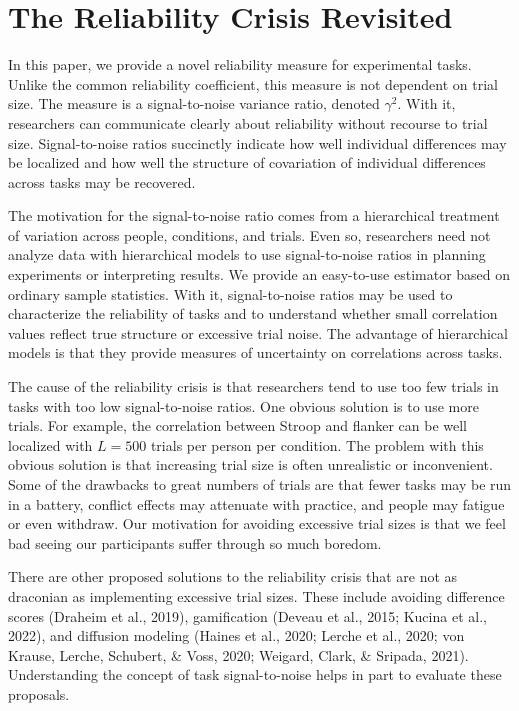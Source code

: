 \documentclass[
  ,man]{apa6}
\begin{document}
\hypertarget{the-reliability-crisis-revisited}{%
\section{The Reliability Crisis Revisited}\label{the-reliability-crisis-revisited}}

In this paper, we provide a novel reliability measure for experimental tasks. Unlike the common reliability coefficient, this measure is not dependent on trial size. The measure is a signal-to-noise variance ratio, denoted \(\gamma^2\). With it, researchers can communicate clearly about reliability without recourse to trial size. Signal-to-noise ratios succinctly indicate how well individual differences may be localized and how well the structure of covariation of individual differences across tasks may be recovered.

The motivation for the signal-to-noise ratio comes from a hierarchical treatment of variation across people, conditions, and trials. Even so, researchers need not analyze data with hierarchical models to use signal-to-noise ratios in planning experiments or interpreting results. We provide an easy-to-use estimator based on ordinary sample statistics. With it, signal-to-noise ratios may be used to characterize the reliability of tasks and to understand whether small correlation values reflect true structure or excessive trial noise. The advantage of hierarchical models is that they provide measures of uncertainty on correlations across tasks.

The cause of the reliability crisis is that researchers tend to use too few trials in tasks with too low signal-to-noise ratios. One obvious solution is to use more trials. For example, the correlation between Stroop and flanker can be well localized with \(L=500\) trials per person per condition. The problem with this obvious solution is that increasing trial size is often unrealistic or inconvenient. Some of the drawbacks to great numbers of trials are that fewer tasks may be run in a battery, conflict effects may attenuate with practice, and people may fatigue or even withdraw. Our motivation for avoiding excessive trial sizes is that we feel bad seeing our participants suffer through so much boredom.

There are other proposed solutions to the reliability crisis that are not as draconian as implementing excessive trial sizes. These include avoiding difference scores (Draheim et al., 2019), gamification (Deveau et al., 2015; Kucina et al., 2022), and diffusion modeling (Haines et al., 2020; Lerche et al., 2020; von Krause, Lerche, Schubert, \& Voss, 2020; Weigard, Clark, \& Sripada, 2021). Understanding the concept of task signal-to-noise helps in part to evaluate these proposals.
\end{document}

